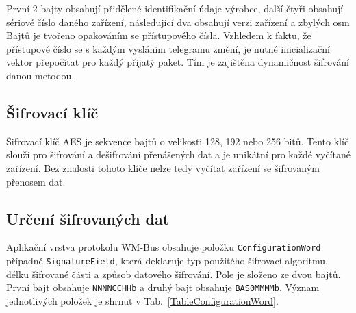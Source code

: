 První 2 bajty obsahují přidělené identifikační údaje výrobce, další čtyři obsahují sériové číslo daného zařízení, následující dva obsahují verzi zařízení a zbylých osm Bajtů je tvořeno opakováním se přístupového čísla. Vzhledem k faktu, že přístupové číslo se s každým vysláním telegramu změní, je nutné inicializační vektor přepočítat pro každý přijatý paket. Tím je zajištěna dynamičnost šifrování danou metodou.

\subsection{Šifrovací klíč}
Šifrovací klíč AES je sekvence bajtů o velikosti 128, 192 nebo 256 bitů. Tento klíč slouží pro šifrování a dešifrování přenášených dat a je unikátní pro každé vyčítané zařízení. Bez znalosti tohoto klíče nelze tedy vyčítat zařízení se šifrovaným přenosem dat.


\subsection{Určení šifrovaných dat}
\label{KapitolaConfigurationWord}
Aplikační vrstva protokolu WM-Bus obsahuje položku \texttt{ConfigurationWord} případně \texttt{SignatureField}, která deklaruje typ použitého šifrovací algoritmu, délku šifrované části a způsob datového šifrování. Pole je složeno ze dvou bajtů. První bajt obsahuje \texttt{NNNNCCHHb} a druhý bajt obsahuje \texttt{BAS0MMMMb}. Význam jednotlivých položek je shrnut v Tab.~\ref{TableConfigurationWord}.


